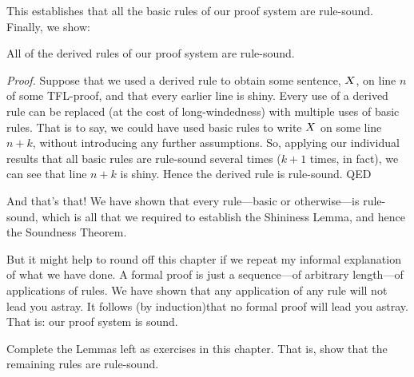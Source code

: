 This establishes that all the basic rules of our proof system are rule-sound. Finally, we show:

\begin{highlighted}All of the derived rules of our proof system are rule-sound.
\end{highlighted}

\emph{Proof.}
	Suppose that we used a derived rule to obtain some sentence, $X$, on line $n$ of some TFL-proof, and that every earlier line is shiny. Every use of a derived rule can be replaced (at the cost of long-windedness) with multiple uses of basic rules. That is to say, we could have used basic rules to write $X$ on some line $n + k$, without introducing any further assumptions. So, applying our individual results that all basic rules are rule-sound several times ($k + 1$ times, in fact), we can see that line $n+k$ is shiny. Hence the derived rule is rule-sound.
QED


And that's that! We have shown that every rule---basic or otherwise---is rule-sound, which is all that we required to establish the Shininess Lemma, and hence the Soundness Theorem.

But it might help to round off this chapter if we repeat my informal explanation of what we have done. A formal proof is just a sequence---of arbitrary length---of applications of rules. We have shown that any application of any rule will not lead you astray. It follows (by induction)that no formal proof will lead you astray. That is: our proof system is sound.

\begin{practiceproblems}

\problempart
\label{pr.Soundness}
Complete the Lemmas left as exercises in this chapter. That is, show that the remaining rules are rule-sound.
\end{practiceproblems}
